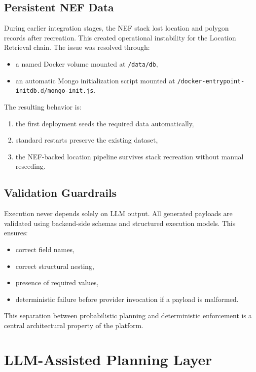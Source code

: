 \documentclass[conference]{IEEEtran}
\begin{document}
\subsection{Persistent NEF Data}

During earlier integration stages, the NEF stack lost location and polygon records after recreation. This created operational instability for the Location Retrieval chain. The issue was resolved through:

\begin{itemize}[leftmargin=1.1em]
\item a named Docker volume mounted at \texttt{/data/db},
\item an automatic Mongo initialization script mounted at \texttt{/docker-entrypoint-initdb.d/mongo-init.js}.
\end{itemize}

The resulting behavior is:

\begin{enumerate}[leftmargin=1.1em]
\item the first deployment seeds the required data automatically,
\item standard restarts preserve the existing dataset,
\item the NEF-backed location pipeline survives stack recreation without manual reseeding.
\end{enumerate}

\subsection{Validation Guardrails}

Execution never depends solely on LLM output. All generated payloads are validated using backend-side schemas and structured execution models. This ensures:

\begin{itemize}[leftmargin=1.1em]
\item correct field names,
\item correct structural nesting,
\item presence of required values,
\item deterministic failure before provider invocation if a payload is malformed.
\end{itemize}

This separation between probabilistic planning and deterministic enforcement is a central architectural property of the platform.

\section{LLM-Assisted Planning Layer}
\end{document}
